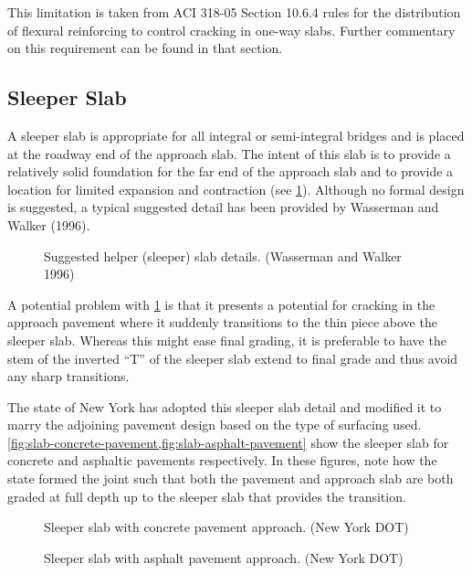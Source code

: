 This limitation is taken from ACI 318-05 Section 10.6.4 rules for the distribution of flexural reinforcing to control cracking in one-way slabs. Further commentary on this requirement can be found in that section.

\subsection{Sleeper Slab}
A sleeper slab is appropriate for all integral or semi-integral bridges and is placed at the roadway end of the
approach slab. The intent of this slab is to provide a relatively solid foundation for the far end of the approach slab
and to provide a location for limited expansion and contraction (see \cref{fig:sleeper-slab-detail}). Although no formal design is
suggested, a typical suggested detail has been provided by Wasserman and Walker (1996).

\begin{figure}
  \caption{Suggested helper (sleeper) slab details. (Wasserman and Walker 1996)}
  \label{fig:sleeper-slab-detail}
\end{figure}

A potential problem with \cref{fig:sleeper-slab-detail} is that it presents a potential for cracking in the approach pavement where it
suddenly transitions to the thin piece above the sleeper slab. Whereas this might ease final grading, it is preferable to
have the stem of the inverted “T” of the sleeper slab extend to final grade and thus avoid any sharp transitions.

The state of New York has adopted this sleeper slab detail and modified it to marry the adjoining pavement design
based on the type of surfacing used. \cref{fig:slab-concrete-pavement,fig:slab-asphalt-pavement} show the sleeper slab for concrete and asphaltic
pavements respectively. In these figures, note how the state formed the joint such that both the pavement and
approach slab are both graded at full depth up to the sleeper slab that provides the transition.

\begin{figure}
  \caption{Sleeper slab with concrete pavement approach. (New York DOT)}
  \label{fig:slab-concrete-pavement}
\end{figure}
\begin{figure}
  \caption{Sleeper slab with asphalt pavement approach. (New York DOT)}
  \label{fig:slab-asphalt-pavement}
\end{figure}

